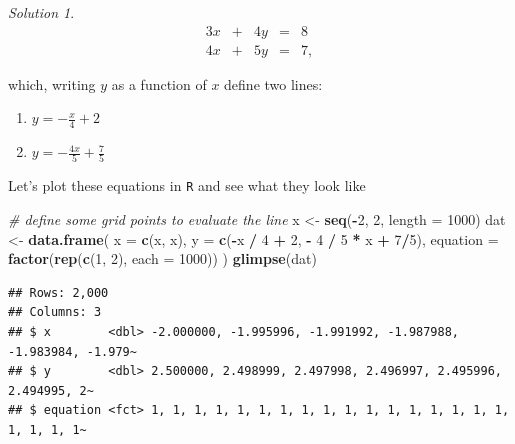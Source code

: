 \documentclass[
]{book}
\newenvironment{Shaded}{\begin{snugshade}}{\end{snugshade}}
\newcommand{\CommentTok}[1]{\textcolor[rgb]{0.56,0.35,0.01}{\textit{#1}}}
\newcommand{\DataTypeTok}[1]{\textcolor[rgb]{0.13,0.29,0.53}{#1}}
\newcommand{\DecValTok}[1]{\textcolor[rgb]{0.00,0.00,0.81}{#1}}
\newcommand{\KeywordTok}[1]{\textcolor[rgb]{0.13,0.29,0.53}{\textbf{#1}}}
\newcommand{\NormalTok}[1]{#1}
\newcommand{\OperatorTok}[1]{\textcolor[rgb]{0.81,0.36,0.00}{\textbf{#1}}}
\newcommand{\StringTok}[1]{\textcolor[rgb]{0.31,0.60,0.02}{#1}}
\providecommand{\tightlist}{%
  \setlength{\itemsep}{0pt}\setlength{\parskip}{0pt}}
\theoremstyle{definition}
\theoremstyle{definition}
\theoremstyle{definition}
\theoremstyle{remark}
\newtheorem*{solution}{Solution}
\begin{document}
\begin{solution}
\begin{alignat*}{3}
x   & {}+{} & 4 y & {}={} & 8 \\
4 x & {}+{} & 5 y & {}={} & 7,
\end{alignat*}

which, writing \(y\) as a function of \(x\) define two lines:

\begin{enumerate}
\def\labelenumi{\arabic{enumi})}
\tightlist
\item
  \(y = -\frac{x}{4} + 2\)
\item
  \(y = -\frac{4x}{5} + \frac{7}{5}\)
\end{enumerate}

Let's plot these equations in \texttt{R} and see what they look like

\begin{Shaded}
\begin{Highlighting}[]
\CommentTok{# define some grid points to evaluate the line}
\NormalTok{x <-}\StringTok{ }\KeywordTok{seq}\NormalTok{(}\OperatorTok{-}\DecValTok{2}\NormalTok{, }\DecValTok{2}\NormalTok{, }\DataTypeTok{length =} \DecValTok{1000}\NormalTok{)}
\NormalTok{dat <-}\StringTok{ }\KeywordTok{data.frame}\NormalTok{(}
    \DataTypeTok{x =} \KeywordTok{c}\NormalTok{(x, x),}
    \DataTypeTok{y =} \KeywordTok{c}\NormalTok{(}\OperatorTok{-}\NormalTok{x }\OperatorTok{/}\StringTok{ }\DecValTok{4} \OperatorTok{+}\StringTok{ }\DecValTok{2}\NormalTok{, }\OperatorTok{-}\StringTok{ }\DecValTok{4} \OperatorTok{/}\StringTok{ }\DecValTok{5} \OperatorTok{*}\StringTok{ }\NormalTok{x }\OperatorTok{+}\StringTok{ }\DecValTok{7}\OperatorTok{/}\DecValTok{5}\NormalTok{),}
    \DataTypeTok{equation =} \KeywordTok{factor}\NormalTok{(}\KeywordTok{rep}\NormalTok{(}\KeywordTok{c}\NormalTok{(}\DecValTok{1}\NormalTok{, }\DecValTok{2}\NormalTok{), }\DataTypeTok{each =} \DecValTok{1000}\NormalTok{))}
\NormalTok{)}
\KeywordTok{glimpse}\NormalTok{(dat)}
\end{Highlighting}
\end{Shaded}

\begin{verbatim}
## Rows: 2,000
## Columns: 3
## $ x        <dbl> -2.000000, -1.995996, -1.991992, -1.987988, -1.983984, -1.979~
## $ y        <dbl> 2.500000, 2.498999, 2.497998, 2.496997, 2.495996, 2.494995, 2~
## $ equation <fct> 1, 1, 1, 1, 1, 1, 1, 1, 1, 1, 1, 1, 1, 1, 1, 1, 1, 1, 1, 1, 1~
\end{verbatim}


\end{solution}
\end{document}
